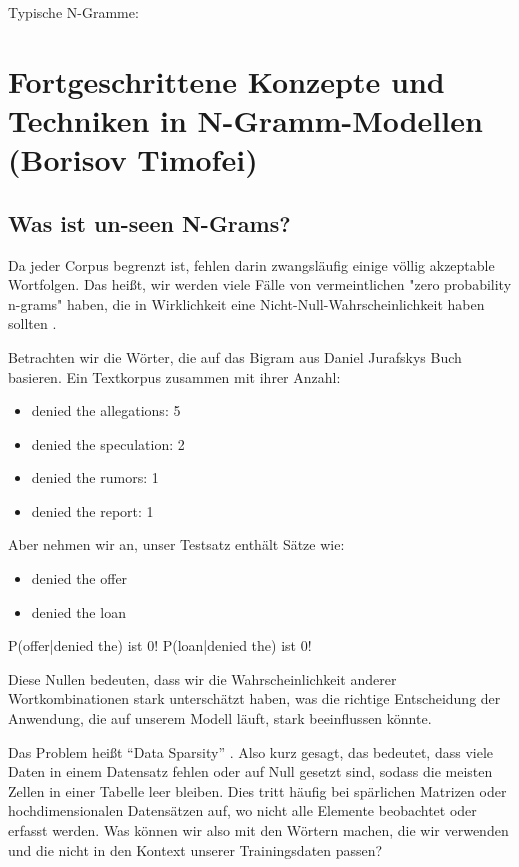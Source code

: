 \documentclass[12pt]{article}
\begin{document}
\noindent Typische N-Gramme:


\clearpage
\section{Fortgeschrittene Konzepte und Techniken in N-Gramm-Modellen (Borisov Timofei)}
\subsection{Was ist un-seen N-Grams?}
Da jeder Corpus begrenzt ist, fehlen darin zwangsläufig einige völlig akzeptable Wortfolgen. Das heißt, wir werden viele Fälle von vermeintlichen "zero probability n-grams" haben, die in Wirklichkeit eine Nicht-Null-Wahrscheinlichkeit haben sollten \cite{jurafsky2023}.

Betrachten wir die Wörter, die auf das Bigram aus Daniel Jurafskys Buch basieren. Ein Textkorpus zusammen mit ihrer Anzahl:

\begin{itemize}
	\item denied the allegations: 5
	\item denied the speculation: 2
	\item denied the rumors: 1
	\item denied the report: 1
\end{itemize}

Aber nehmen wir an, unser Testsatz enthält Sätze wie:
\begin{itemize}
	\item denied the offer
	\item denied the loan
\end{itemize}

P(offer|denied the) ist 0!
P(loan|denied the) ist 0!

Diese Nullen bedeuten, dass wir die Wahrscheinlichkeit anderer Wortkombinationen stark unterschätzt haben, was die richtige Entscheidung der Anwendung, die auf unserem Modell läuft, stark beeinflussen könnte.

Das Problem heißt “Data Sparsity” \cite{dremio2023}. Also kurz gesagt, das bedeutet, dass viele Daten in einem Datensatz fehlen oder auf Null gesetzt sind, sodass die meisten Zellen in einer Tabelle leer bleiben. Dies tritt häufig bei spärlichen Matrizen oder hochdimensionalen Datensätzen auf, wo nicht alle Elemente beobachtet oder erfasst werden. Was können wir also mit den Wörtern machen, die wir verwenden und die nicht in den Kontext unserer Trainingsdaten passen?
\end{document}
